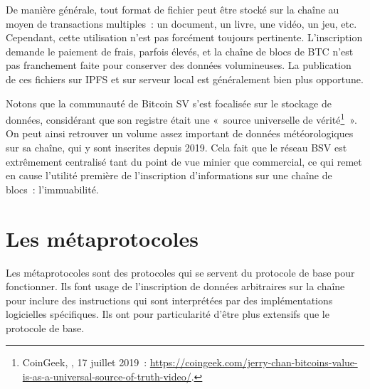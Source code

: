 De manière générale, tout format de fichier peut être stocké sur la chaîne au moyen de transactions multiples~: un document, un livre, une vidéo, un jeu, etc. Cependant, cette utilisation n'est pas forcément toujours pertinente. L'inscription demande le paiement de frais, parfois élevés, et la chaîne de blocs de BTC n'est pas franchement faite pour conserver des données volumineuses. La publication de ces fichiers sur IPFS et sur serveur local est généralement bien plus opportune.

Notons que la communauté de Bitcoin SV s'est focalisée sur le stockage de données, considérant que son registre était une «~source universelle de vérité\footnote{CoinGeek, , 17 juillet 2019~: \url{https://coingeek.com/jerry-chan-bitcoins-value-is-as-a-universal-source-of-truth-video/}.}~». On peut ainsi retrouver un volume assez important de données météorologiques sur sa chaîne, qui y sont inscrites depuis 2019. Cela fait que le réseau BSV est extrêmement centralisé tant du point de vue minier que commercial, ce qui remet en cause l'utilité première de l'inscription d'informations sur une chaîne de blocs~: l'immuabilité.

\section*{Les métaprotocoles}

Les métaprotocoles sont des protocoles qui se servent du protocole de base pour fonctionner. Ils font usage de l'inscription de données arbitraires sur la chaîne pour inclure des instructions qui sont interprétées par des implémentations logicielles spécifiques. Ils ont pour particularité d'être plus extensifs que le protocole de base.

